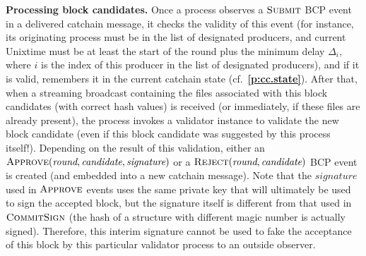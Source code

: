 \documentclass[12pt,oneside]{article}
\def\makepoint#1{\medbreak\noindent{\bf #1.\ }}
\def\nxsubpoint{\refstepcounter{subsubsection}%
  \smallbreak\makepoint{\thesubsubsection}}
\def\refpoint#1{{\rm\textbf{\ref{#1}}}}
\let\ptref=\refpoint
\def\emb#1{\textbf{#1.}}
\let\vr=\textit
\def\opsc#1{\operatorname{\textsc{#1}}}
\def\Submit{\opsc{Submit}}
\def\Approve{\opsc{Approve}}
\def\Reject{\opsc{Reject}}
\def\CommitSign{\opsc{CommitSign}}
\def\wround{\vr{round}}
\def\wcandidate{\vr{candidate}}
\def\wsignature{\vr{signature}}
\begin{document}
\nxsubpoint\emb{Processing block candidates}
Once a process observes a $\Submit$ BCP event in a delivered catchain message, it checks the validity of this event (for instance, its originating process must be in the list of designated producers, and current Unixtime must be at least the start of the round plus the minimum delay $\Delta_i$, where $i$ is the index of this producer in the list of designated producers), and if it is valid, remembers it in the current catchain state (cf.~\ptref{p:cc.state}). After that, when a streaming broadcast containing the files associated with this block candidates (with correct hash values) is received (or immediately, if these files are already present), the process invokes a validator instance to validate the new block candidate (even if this block candidate was suggested by this process itself!). Depending on the result of this validation, either an $\Approve(\wround,\wcandidate,\wsignature)$ or a $\Reject(\wround,\wcandidate)$ BCP event is created (and embedded into a new catchain message). Note that the $\wsignature$ used in $\Approve$ events uses the same private key that will ultimately be used to sign the accepted block, but the signature itself is different from that used in $\CommitSign$ (the hash of a structure with different magic number is actually signed). Therefore, this interim signature cannot be used to fake the acceptance of this block by this particular validator process to an outside observer.
\end{document}
